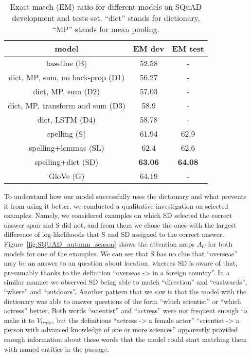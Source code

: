 \begin{table}
   \caption{\label{table:squad}Exact match (EM) ratio for different models on SQuAD development and tests set. ``dict'' stands for dictionary, ``MP'' stands for mean pooling.} 
  \centering
  \begin{tabular}{ccc}
  	\toprule
    model & EM dev & EM test \\
    \midrule
baseline (B) & 52.58 & - \\
    \midrule
    dict, MP, sum, no back-prop (D1) & 56.27 & - \\
    dict, MP, sum (D2) & 57.03 & - \\    
    dict, MP, transform and sum (D3) & 58.9 & - \\
    dict, LSTM (D4) & 58.78 & -  \\
    spelling (S) & 61.94 & 62.9 \\ 
spelling+lemmas (SL) & 62.4 & 62.6 \\
spelling+dict (SD) & \textbf{63.06} & \textbf{64.08} \\ 
\hline
    GloVe (G) & 64.19 & -\\ 
    \bottomrule
  \end{tabular}
\end{table}

To understand how our model successfully uses the dictionary and what prevents it from using it better, we conducted a qualitative investigation on selected examples. Namely, we considered examples on which SD selected the correct answer span and S did not, and from them we chose the ones with the largest difference of log-likelihoods that S and SD assigned to the correct answer. Figure~\ref{fig:SQUAD_autumn_season} shows the attention maps $A_C$ for both models for one of the examples. We can see that S has no clue that ``overseas'' may be an answer to an question about location, whereas SD is aware of that, presumably thanks to the definition ``overseas -> in a foreign country''. In a similar manner we observed SD being able to match ``direction'' and ``eastwards'', ``where'' and ``outdoors''. Another pattern that we saw is that the model with the dictionary was able to answer questions of the form ``which scientist'' or ``which actress'' better. Both words ``scientist'' and ``actress'' were not frequent enough to make it to $V_{train}$, but the definitions ``actress -> a female actor'' ``scientist -> a person with advanced knowledge of one or more sciences'' apparently provided enough information about these words that the model could start matching them with named entities in the passage. 



